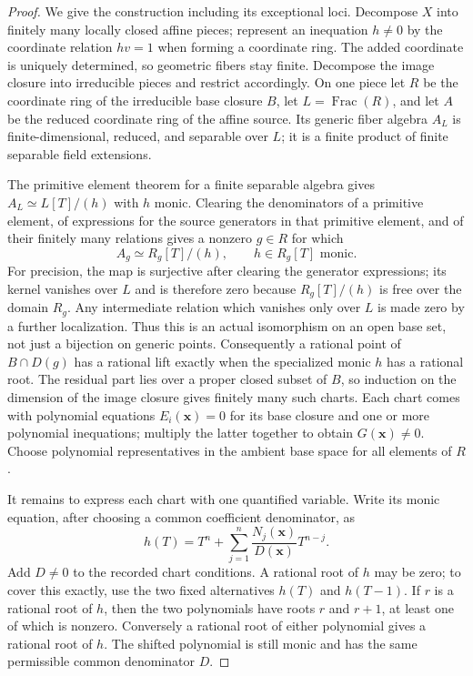 \begin{proof}
We give the construction including its exceptional loci. Decompose $X$
into finitely many locally closed affine pieces; represent an inequation
$h\ne0$ by the coordinate relation $hv=1$ when forming a coordinate ring.
The added coordinate is uniquely determined, so geometric fibers stay
finite. Decompose the image closure into irreducible pieces and restrict
accordingly. On one piece let $R$ be the coordinate ring of the irreducible
base closure $B$, let $L=\operatorname{Frac}(R)$, and let $A$ be the reduced
coordinate ring of the affine source. Its generic fiber algebra
$A_L$ is finite-dimensional, reduced, and separable over $L$; it is a
finite product of finite separable field extensions.

The primitive element theorem for a finite separable algebra gives
$A_L\simeq L[T]/(h)$ with $h$ monic. Clearing the denominators of a
primitive element, of expressions for the source generators in that
primitive element, and of their finitely many relations gives a nonzero
$g\in R$ for which
\[
 A_g\simeq R_g[T]/(h),\qquad h\in R_g[T]\text{ monic}.
\]
For precision, the map is surjective after clearing the generator
expressions; its kernel vanishes over $L$ and is therefore zero because
$R_g[T]/(h)$ is free over the domain $R_g$. Any intermediate relation
which vanishes only over $L$ is made zero by a further localization.
Thus this is an actual isomorphism on an open base set, not just a
bijection on generic points. Consequently a rational point of $B\cap D(g)$
has a rational lift exactly when the specialized monic $h$ has a rational
root. The residual part lies over a proper closed subset of $B$, so
induction on the dimension of the image closure gives finitely many such
charts. Each chart comes with polynomial equations $E_i(\mathbf x)=0$
for its base closure and one or more polynomial inequations; multiply the
latter together to obtain $G(\mathbf x)\ne0$. Choose polynomial
representatives in the ambient base space for all elements of $R$.

It remains to express each chart with one quantified variable. Write its
monic equation, after choosing a common coefficient denominator, as
\[
 h(T)=T^n+\sum_{j=1}^n\frac{N_j(\mathbf x)}{D(\mathbf x)}T^{n-j}.
\]
Add $D\ne0$ to the recorded chart conditions. A rational root of $h$
may be zero; to cover this exactly, use the two fixed alternatives
$h(T)$ and $h(T-1)$. If $r$ is a rational root of $h$, then the two
polynomials have roots $r$ and $r+1$, at least one of which is nonzero.
Conversely a rational root of either polynomial gives a rational root of
$h$. The shifted polynomial is still monic and has the same permissible
common denominator $D$.


\end{proof}
